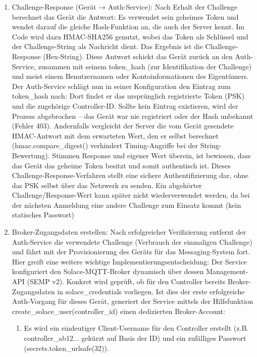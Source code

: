 \begin{enumerate}
    \item Challenge-Response (Gerät → Auth-Service): Nach Erhalt der Challenge berechnet das Gerät die Antwort: Es verwendet sein geheimes Token und wendet darauf die gleiche Hash-Funktion an, die auch der Server kennt. Im Code wird dazu HMAC-SHA256 genutzt, wobei das Token als Schlüssel und der Challenge-String als Nachricht dient. Das Ergebnis ist die Challenge-Response (Hex-String). Diese Antwort schickt das Gerät zurück an den Auth-Service, zusammen mit seinem token\_hash (zur Identifikation der Challenge) und meist einem Benutzernamen oder Kontoinformationen des Eigentümers. Der Auth-Service schlägt nun in seiner Konfiguration den Eintrag zum token\_hash nach: Dort findet er das ursprünglich registrierte Token (PSK) und die zugehörige Controller-ID. Sollte kein Eintrag existieren, wird der Prozess abgebrochen – das Gerät war nie registriert oder der Hash unbekannt (Fehler 403). Andernfalls vergleicht der Server die vom Gerät gesendete HMAC-Antwort mit dem erwarteten Wert, den er selbst berechnet (hmac.compare\_digest() verhindert Timing-Angriffe bei der String-Bewertung). Stimmen Response und eigener Wert überein, ist bewiesen, dass das Gerät das geheime Token besitzt und somit authentisch ist. Dieses Challenge-Response-Verfahren stellt eine sichere Authentifizierung dar\cite{hmacRFC}, ohne das PSK selbst über das Netzwerk zu senden. Ein abgehörter Challenge/Response-Wert kann später nicht wiederverwendet werden, da bei der nächsten Anmeldung eine andere Challenge zum Einsatz kommt (kein statisches Passwort)
    \item Broker-Zugangsdaten erstellen: Nach erfolgreicher Verifizierung entfernt der Auth-Service die verwendete Challenge (Verbrauch der einmaligen Challenge) und fährt mit der Provisionierung des Geräts für das Messaging-System fort. Hier greift eine weitere wichtige Implementierungsentscheidung: Der Service konfiguriert den Solace-MQTT-Broker dynamisch über dessen Management-API (SEMP v2). Konkret wird geprüft, ob für den Controller bereits Broker-Zugangsdaten in solace\_credentials vorliegen. Ist dies der erste erfolgreiche Auth-Vorgang für dieses Gerät, generiert der Service mittels der Hilfsfunktion create\_solace\_user(controller\_id) einen dedizierten Broker-Account:
    \begin{enumerate}
        \item Es wird ein eindeutiger Client-Username für den Controller erstellt (z.B. controller\_ab12... gekürzt auf Basis der ID) und ein zufälliges Passwort \\ (secrets.token\_urlsafe(32)).

\end{enumerate}
\end{enumerate}
